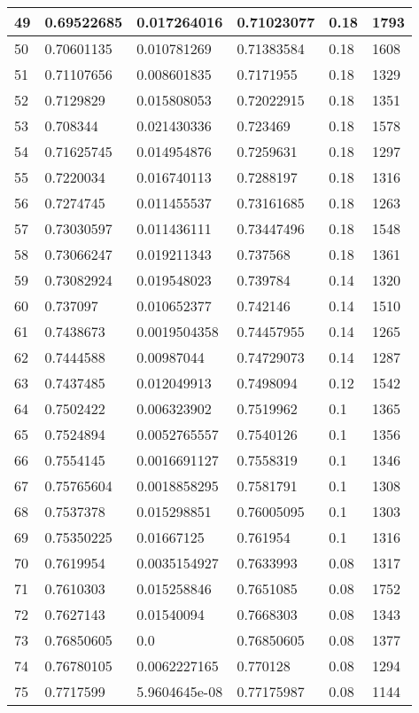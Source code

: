 \begin{longtable}{|l|l|l|l|l|l|}
49 & 0.69522685 & 0.017264016 & 0.71023077 & 0.18 & 1793 \\ \hline 
50 & 0.70601135 & 0.010781269 & 0.71383584 & 0.18 & 1608 \\ \hline 
51 & 0.71107656 & 0.008601835 & 0.7171955 & 0.18 & 1329 \\ \hline 
52 & 0.7129829 & 0.015808053 & 0.72022915 & 0.18 & 1351 \\ \hline 
53 & 0.708344 & 0.021430336 & 0.723469 & 0.18 & 1578 \\ \hline 
54 & 0.71625745 & 0.014954876 & 0.7259631 & 0.18 & 1297 \\ \hline 
55 & 0.7220034 & 0.016740113 & 0.7288197 & 0.18 & 1316 \\ \hline 
56 & 0.7274745 & 0.011455537 & 0.73161685 & 0.18 & 1263 \\ \hline 
57 & 0.73030597 & 0.011436111 & 0.73447496 & 0.18 & 1548 \\ \hline 
58 & 0.73066247 & 0.019211343 & 0.737568 & 0.18 & 1361 \\ \hline 
59 & 0.73082924 & 0.019548023 & 0.739784 & 0.14 & 1320 \\ \hline 
60 & 0.737097 & 0.010652377 & 0.742146 & 0.14 & 1510 \\ \hline 
61 & 0.7438673 & 0.0019504358 & 0.74457955 & 0.14 & 1265 \\ \hline 
62 & 0.7444588 & 0.00987044 & 0.74729073 & 0.14 & 1287 \\ \hline 
63 & 0.7437485 & 0.012049913 & 0.7498094 & 0.12 & 1542 \\ \hline 
64 & 0.7502422 & 0.006323902 & 0.7519962 & 0.1 & 1365 \\ \hline 
65 & 0.7524894 & 0.0052765557 & 0.7540126 & 0.1 & 1356 \\ \hline 
66 & 0.7554145 & 0.0016691127 & 0.7558319 & 0.1 & 1346 \\ \hline 
67 & 0.75765604 & 0.0018858295 & 0.7581791 & 0.1 & 1308 \\ \hline 
68 & 0.7537378 & 0.015298851 & 0.76005095 & 0.1 & 1303 \\ \hline 
69 & 0.75350225 & 0.01667125 & 0.761954 & 0.1 & 1316 \\ \hline 
70 & 0.7619954 & 0.0035154927 & 0.7633993 & 0.08 & 1317 \\ \hline 
71 & 0.7610303 & 0.015258846 & 0.7651085 & 0.08 & 1752 \\ \hline 
72 & 0.7627143 & 0.01540094 & 0.7668303 & 0.08 & 1343 \\ \hline 
73 & 0.76850605 & 0.0 & 0.76850605 & 0.08 & 1377 \\ \hline 
74 & 0.76780105 & 0.0062227165 & 0.770128 & 0.08 & 1294 \\ \hline 
75 & 0.7717599 & 5.9604645e-08 & 0.77175987 & 0.08 & 1144 \\ \hline 
\end{longtable}